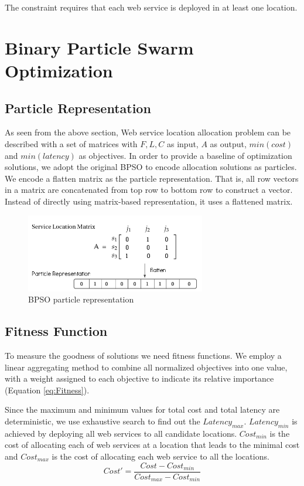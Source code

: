 \begin{flushleft}The constraint requires that each web service is deployed in at least one location.\end{flushleft}

\section{Binary Particle Swarm Optimization}
\subsection{Particle Representation}
\label{sec:rep}

As seen from the above section, Web service location allocation problem can be described with a set of matrices with $F, L, C$ as input, $A$ as output, $min(cost)$ and $min(latency)$ as objectives.
In order to provide a baseline of optimization solutions, we adopt the original BPSO to encode allocation solutions as particles. 
We encode a flatten matrix as the particle representation.
That is, all row vectors in a matrix are concatenated from top row to bottom row to construct a vector.
 Instead of directly using matrix-based representation, it uses a flattened matrix.
 
 \begin{figure}[H]
 \centering
   \includegraphics[width=0.7\textwidth]{pics/psorepresentation.png}
   \caption{BPSO particle representation}
   \label{fig:flatten}
 \end{figure}
 
 \subsection{Fitness Function}
To measure the goodness of solutions we need fitness functions.
We employ a linear aggregating method to combine all normalized objectives into one value, with a weight assigned to each
objective to indicate its relative importance (Equation \ref{eq:Fitness}).

Since the maximum and minimum values for total cost and total latency are deterministic, we use exhaustive search to
find out the $Latency_{max}$. $Latency_{min}$ is achieved by deploying all web services to all candidate locations.
$Cost_{min}$ is the cost of allocating each of web services at a location that leads to the minimal cost 
and $Cost_{max}$ is the cost of allocating each web service to all the locations.
 \begin{equation}
 	\label{eq:cost_prime}
 	Cost' = \frac{Cost - Cost_{min}}{Cost_{max} - Cost_{min}}
 \end{equation}
 
